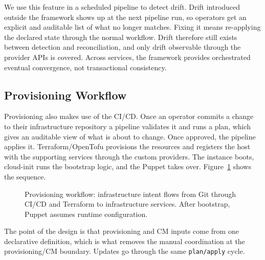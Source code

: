 We use this feature in a scheduled pipeline to detect drift. Drift introduced outside the framework shows up at the next pipeline run, so operators get an explicit and auditable list of what no longer matches. Fixing it means re-applying the declared state through the normal workflow. Drift therefore still exists between detection and reconciliation, and only drift observable through the provider APIs is covered. Across services, the framework provides orchestrated eventual convergence, not transactional consistency.

\subsection{Provisioning Workflow}

Provisioning also makes use of the CI/CD. 
Once an operator commits a change to their infrastructure repository a pipeline validates it and runs a plan, which gives an auditable view of what is about to change.
Once approved, the pipeline applies it.
Terraform/OpenTofu provisions the resources and registers the host with the supporting services through the custom providers.
The instance boots, cloud-init runs the bootstrap logic, and the Puppet takes over. Figure~\ref{fig:provisioning-seq} shows the sequence.

\begin{figure}[tbp]
  \centering
  \scalebox{0.95}{}
  \caption{Provisioning workflow: infrastructure intent flows from Git through CI/CD and Terraform to infrastructure services. After bootstrap, Puppet assumes runtime configuration.}
  \label{fig:provisioning-seq}
\end{figure}

The point of the design is that provisioning and CM inputs come from one declarative definition, which is what removes the manual coordination at the provisioning/CM boundary. Updates go through the same \texttt{plan/apply} cycle.
